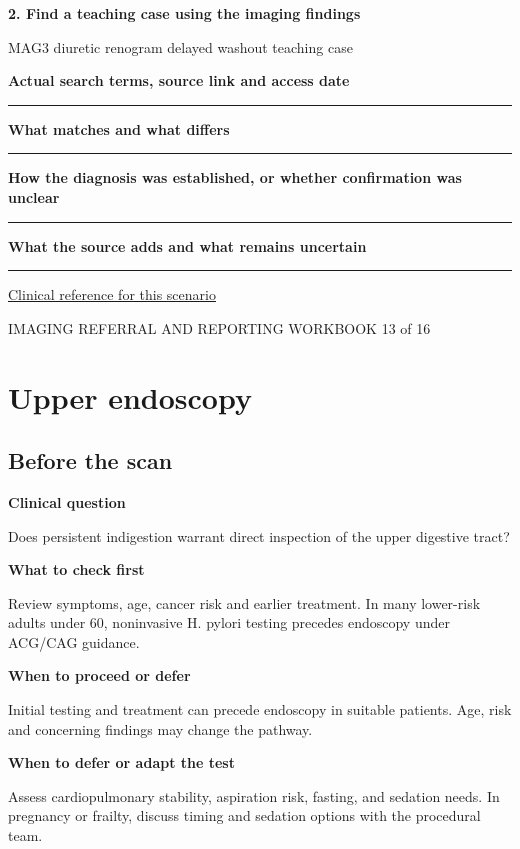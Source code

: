 \documentclass[11pt,a4paper]{article}
\newcommand{\record}[1]{\textbf{#1}\par\vspace{0.55\baselineskip}\hrule\vspace{0.35\baselineskip}}
\begin{document}
\textbf{2. Find a teaching case using the imaging findings}\par MAG3 diuretic renogram delayed washout teaching case\par

\record{Actual search terms, source link and access date}

\record{What matches and what differs}

\record{How the diagnosis was established, or whether confirmation was unclear}

\record{What the source adds and what remains uncertain}

\small\href{https://snmmi.org/Web/Web/Clinical-Practice/Procedure-Standards/Standards/Diuretic-Renal-Scintigraphy-in-Adults-With-Suspected-Upper-Urinary-Tract-Obstruction-1-0.aspx}{Clinical reference for this scenario}

\normalsize

\newpage

{\small IMAGING REFERRAL AND REPORTING WORKBOOK \hfill 13 of 16}

\section*{Upper endoscopy}

\subsection*{Before the scan}

\textbf{Clinical question}\par Does persistent indigestion warrant direct inspection of the upper digestive tract?\par

\textbf{What to check first}\par Review symptoms, age, cancer risk and earlier treatment. In many lower-risk adults under 60, noninvasive H. pylori testing precedes endoscopy under ACG/CAG guidance.\par

\textbf{When to proceed or defer}\par Initial testing and treatment can precede endoscopy in suitable patients. Age, risk and concerning findings may change the pathway.\par

\textbf{When to defer or adapt the test}\par Assess cardiopulmonary stability, aspiration risk, fasting, and sedation needs. In pregnancy or frailty, discuss timing and sedation options with the procedural team.\par
\end{document}
